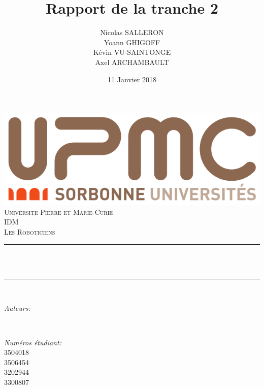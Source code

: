 \documentclass[12pt]{article}
\title{Rapport de la tranche 2}
\author{Nicolas SALLERON\\ Yoann GHIGOFF\\ Kévin VU-SAINTONGE \\ Axel ARCHAMBAULT}
\date{11 Janvier 2018}
\makeatletter
\let\thetitle\@title
\let\theauthor\@author
\let\thedate\@date
\makeatother
\begin{document}
\begin{titlepage}
	\centering
    \vspace*{0.5 cm}
    \includegraphics[scale = 0.20]{UPMC_Sorbonne_Universites_svg.png}\\[1.0 cm]	%
    \textsc{\LARGE Universite Pierre et Marie-Curie}\\[2.0 cm]	%
	\textsc{\LARGE IDM}\\[0.5 cm]			
	\textsc{\large Les Roboticiens}\\[0.5 cm]				%
	\rule{\linewidth}{0.2 mm} \\[0.4 cm]
	{ \huge \bfseries \thetitle}\\
	\rule{\linewidth}{0.2 mm} \\[1.5 cm]
	
	\begin{minipage}{0.4\textwidth}
		\begin{flushleft} \large
			\emph{Auteurs:}\\
			\theauthor
			\end{flushleft}
			\end{minipage}~
			\begin{minipage}{0.4\textwidth}
			\begin{flushright} \large
			\emph{Numéros étudiant:} \\
			3504018\\3506454\\3202944\\3300807									%
		\end{flushright}
	\end{minipage}\\[5 cm]
	
	{\large \thedate}\\[2 cm]
 
	\vfill
	
\end{titlepage}
\renewcommand{\contentsname}{Sommaire}
    \tableofcontents
    \newpage
\end{document}
